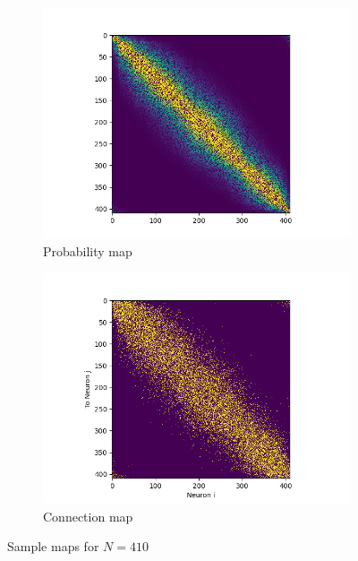 \documentclass[a4paper,12pt]{article}
\begin{document}
\begin{figure}
    \begin{subfigure}{0.55\textwidth}
        \centering
        \includegraphics[width=\textwidth]{prob_map.png}
        \caption{Probability map}
        \label{prob_map}
    \end{subfigure}%
    \hfill
    \begin{subfigure}{0.55\textwidth}
        \centering
        \includegraphics[width=\textwidth]{connections.png}
        \caption{Connection map}
        \label{connectionmap}
    \end{subfigure}
    \caption{Sample maps for $N = 410$}
\end{figure}
\end{document}
